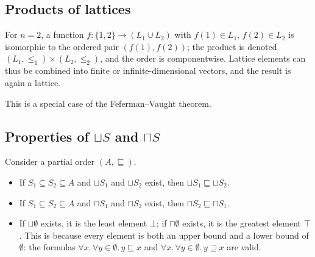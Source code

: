  
 
 
\subsection*{Products of lattices}
 
For $n = 2$, a function $f : \{1, 2\} \to (L_1 \cup L_2)$ with $f(1) \in L_1$, $f(2) \in L_2$ is isomorphic to the ordered pair $(f(1), f(2))$; the product is denoted $(L_1, \le_1) \times (L_2, \le_2)$, and the order is componentwise. Lattice elements can thus be combined into finite or infinite-dimensional vectors, and the result is again a lattice.
 
 
This is a special case of the Feferman--Vaught theorem.
 
\subsection*{Properties of $\sqcup S$ and $\sqcap S$}
 
Consider a partial order $(A, \sqsubseteq)$.
\begin{itemize}
  \item If $S_1 \subseteq S_2 \subseteq A$ and $\sqcup S_1$ and $\sqcup S_2$ exist, then $\sqcup S_1 \sqsubseteq \sqcup S_2$.
  \item If $S_1 \subseteq S_2 \subseteq A$ and $\sqcap S_1$ and $\sqcap S_2$ exist, then $\sqcap S_2 \sqsubseteq \sqcap S_1$.
  \item If $\sqcup \emptyset$ exists, it is the least element $\bot$; if $\sqcap \emptyset$ exists, it is the greatest element $\top$. This is because every element is both an upper bound and a lower bound of $\emptyset$: the formulas $\forall x.\, \forall y \in \emptyset.\, y \sqsubseteq x$ and $\forall x.\, \forall y \in \emptyset.\, y \sqsupseteq x$ are valid.
\end{itemize}


